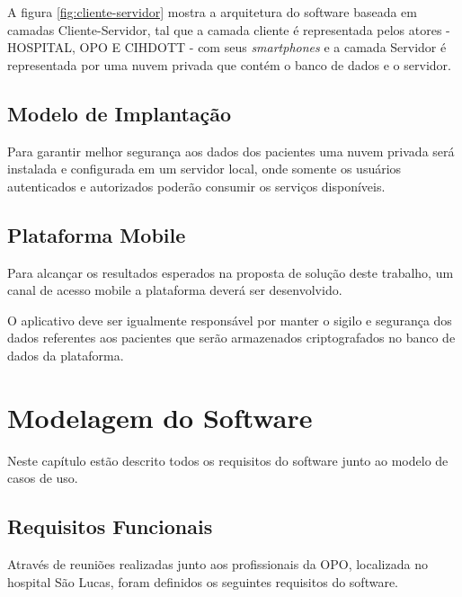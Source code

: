 \documentclass[portuguese,oneside]{tcc}
\begin{document}
A figura \ref{fig:cliente-servidor} mostra a arquitetura do software baseada em camadas Cliente-Servidor, tal que a camada cliente é representada pelos atores - HOSPITAL, OPO E CIHDOTT - com seus \textit{smartphones} e a camada Servidor é representada por uma nuvem privada que contém o banco de dados e o servidor.


\section{Modelo de Implantação}
Para garantir melhor segurança aos dados dos pacientes uma nuvem privada será instalada e configurada em um servidor local, onde somente os usuários autenticados e autorizados poderão consumir os serviços disponíveis.


\section{Plataforma Mobile}

Para alcançar os resultados esperados na proposta de solução deste trabalho, um canal de acesso mobile a plataforma deverá ser desenvolvido. 
 

O aplicativo deve ser igualmente responsável por manter o sigilo e segurança dos dados referentes aos pacientes que serão armazenados criptografados no banco de dados da plataforma.

\chapter{Modelagem do Software}
Neste capítulo estão descrito todos os requisitos do software junto ao modelo de casos de uso.

\section{Requisitos Funcionais}
Através de reuniões realizadas junto aos profissionais da OPO, localizada no hospital São Lucas, foram definidos os seguintes requisitos do software.
\end{document}
